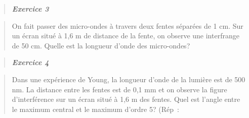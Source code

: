 \begin{quote}
\emph{\textbf{Exercice 3}}
\end{quote}

\begin{quote}
On fait passer des micro-ondes à travers deux fentes séparées de 1 cm.
Sur un écran situé à 1,6 m de distance de la fente, on observe une
interfrange de 50 cm. Quelle est la longueur d'onde des micro-ondes?
\end{quote}

\begin{quote}
\end{quote}

\begin{quote}
\end{quote}

\begin{quote}
\end{quote}

\begin{quote}
\end{quote}

\begin{quote}
\end{quote}

\begin{quote}
\end{quote}

\begin{quote}
\end{quote}

\begin{quote}
\end{quote}

\begin{quote}
\end{quote}

\begin{quote}
\end{quote}

\begin{quote}
\end{quote}

\begin{quote}
\emph{\textbf{Exercice 4}}
\end{quote}

\begin{quote}
Dans une expérience de Young, la longueur d'onde de la lumière est de
500 nm. La distance entre les fentes est de 0,1 mm et on observe la
figure d'interférence sur un écran situé à 1,6 m des fentes. Quel est
l'angle entre le maximum central et le maximum d'ordre 5? (Rép~:
\end{quote}

